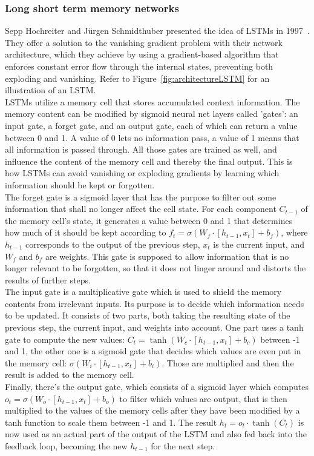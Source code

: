 \documentclass[
a4paper,
pagesize,
pdftex,
12pt,
twoside, %
BCOR=5mm, %
ngerman,
fleqn,
final,
]{scrartcl}
\begin{document}
	\subsubsection{Long short term memory networks}\label{LSTM}
	Sepp Hochreiter and Jürgen Schmidthuber presented the idea of LSTMs in 1997~\cite{Hochreiter.1997}. They offer a solution to the vanishing gradient problem with their network architecture, which they achieve by using a gradient-based algorithm that enforces constant error flow through the internal states, preventing both exploding and vanishing. Refer to Figure~\ref{fig:architectureLSTM} for an illustration of an LSTM.\\
	LSTMs utilize a memory cell that stores accumulated context information. The memory content can be modified by sigmoid neural net layers called 'gates': an input gate, a forget gate, and an output gate, each of which can return a value between 0 and 1. A value of 0 lets no information pass, a value of 1 means that all information is passed through. All those gates are trained as well, and influence the content of the memory cell and thereby the final output. This is how LSTMs can avoid vanishing or exploding gradients by learning which information should be kept or forgotten.\\
	The forget gate is a sigmoid layer that has the purpose to filter out some information that shall no longer affect the cell state. For each component $C_{t-1}$ of the memory cell's state, it generates a value between 0 and 1 that determines how much of it should be kept according to $f_t = \sigma (W_f \cdot [h_{t-1}, x_t] + b_f)$, where $h_{t-1}$ corresponds to the output of the previous step, $x_t$ is the current input, and $W_f$ and $b_f$ are weights. This gate is supposed to allow information that is no longer relevant to be forgotten, so that it does not linger around and distorts the results of further steps.\\
	The input gate is a multiplicative gate which is used to shield the memory contents from irrelevant inputs. Its purpose is to decide which information needs to be updated. It consists of two parts, both taking the resulting state of the previous step, the current input, and weights into account. One part uses a tanh gate to compute the new values: $C_t = \tanh (W_c \cdot [h_{t-1} , x_t] + b_c)$ between -1 and 1, the other one is a sigmoid gate that decides which values are even put in the memory cell: $\sigma (W_i \cdot [h_{t-1}, x_t] + b_i)$. Those are multiplied and then the result is added to the memory cell.\\
	Finally, there's the output gate, which consists of a sigmoid layer which computes $o_t = \sigma (W_o \cdot [h_{t-1}, x_t] + b_o)$ to filter which values are output, that is then multiplied to the values of the memory cells after they have been modified by a tanh function to scale them between -1 and 1. The result $h_t = o_t \cdot \tanh(C_t)$ is now used as an actual part of the output of the LSTM and also fed back into the feedback loop, becoming the new $h_{t-1}$ for the next step.	
	
\end{document}
